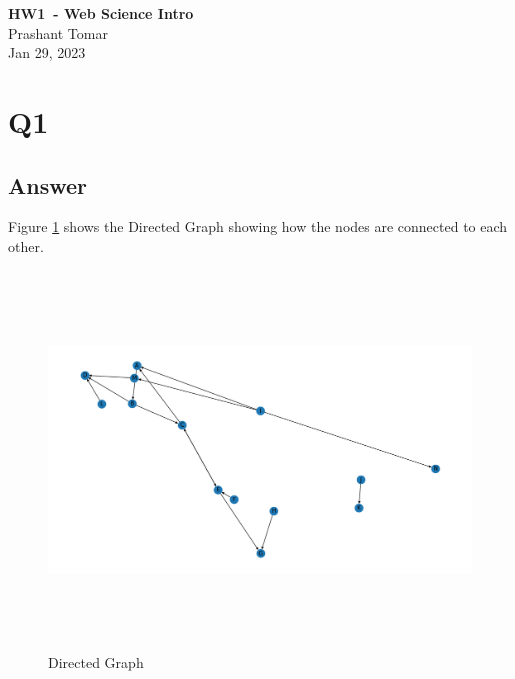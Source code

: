\documentclass[12pt]{article}
\begin{document}
\begin{centering}
{\large\textbf{HW1\ - Web Science Intro}}\\ 
Prashant Tomar\\
Jan 29, 2023\\
\end{centering}


\section*{Q1}

\emph{}

\subsection*{Answer}

Figure \ref{fig:Q1a} shows the Directed Graph showing how the nodes are connected to each other.


\begin{figure}[h!]
    \centering
    \includegraphics[trim=0 0 0 0, clip, width=\textwidth,height=10cm] {Q1a.png}
    \caption{Directed Graph}
    \label{fig:Q1a}
\end{figure}
\end{document}
